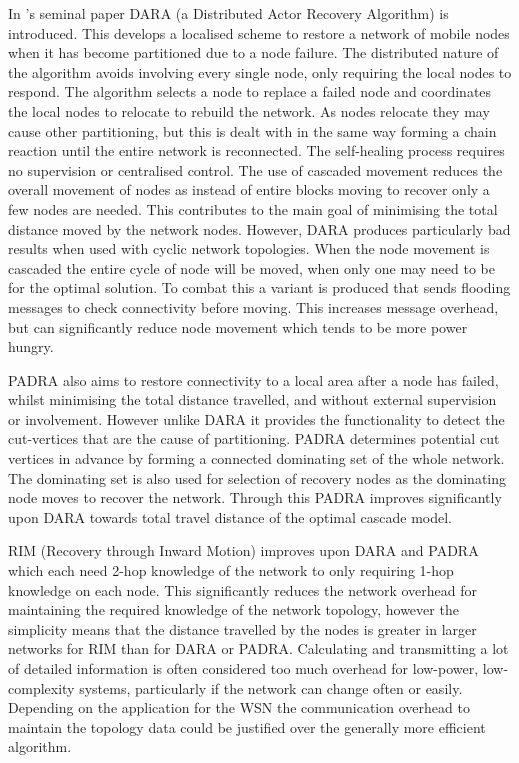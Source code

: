 \documentclass[authoryearcitations]{UoYCSproject}
\begin{document}
In \citet{Abbasi2007}'s seminal paper DARA (a Distributed Actor Recovery Algorithm) is introduced. This develops a localised scheme to restore a network of mobile nodes when it has become partitioned due to a node failure. The distributed nature of the algorithm avoids involving every single node, only requiring the local nodes to respond. The algorithm selects a node to replace a failed node and coordinates the local nodes to relocate to rebuild the network. As nodes relocate they may cause other partitioning, but this is dealt with in the same way forming a chain reaction until the entire network is reconnected. The self-healing process requires no supervision or centralised control. The use of cascaded movement reduces the overall movement of nodes as instead of entire blocks moving to recover only a few nodes are needed. This contributes to the main goal of minimising the total distance moved by the network nodes.
However, DARA produces particularly bad results when used with cyclic network topologies. When the node movement is cascaded the entire cycle of node will be moved, when only one may need to be for the optimal solution. To combat this a variant is produced that sends flooding messages to check connectivity before moving. This increases message overhead, but can significantly reduce node movement which tends to be more power hungry.

PADRA \citep{Akkaya2008} also aims to restore connectivity to a local area after a node has failed, whilst minimising the total distance travelled, and without external supervision or involvement. However unlike DARA it provides the functionality to detect the cut-vertices that are the cause of partitioning. PADRA determines potential cut vertices in advance by forming a connected dominating set of the whole network. The dominating set is also used for selection of recovery nodes as the dominating node moves to recover the network. Through this PADRA improves significantly upon DARA towards total travel distance of the optimal cascade model.

RIM (Recovery through Inward Motion) \citep{Younis2010} improves upon DARA and PADRA which each need 2-hop knowledge of the network to only requiring 1-hop knowledge on each node. This significantly reduces the network overhead for maintaining the required knowledge of the network topology, however the simplicity means that the distance travelled by the nodes is greater in larger networks for RIM than for DARA or PADRA. Calculating and transmitting a lot of detailed information is often considered too much overhead for low-power, low-complexity systems, particularly if the network can change often or easily. Depending on the application for the WSN the communication overhead to maintain the topology data could be justified over the generally more efficient algorithm.
\end{document}
